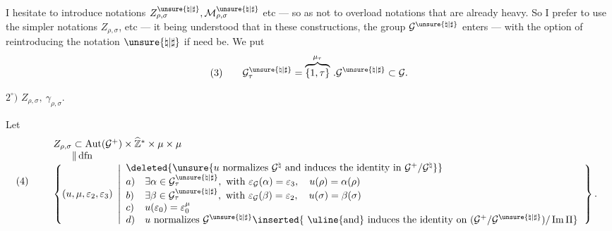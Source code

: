I hesitate to introduce notations
$Z_{\rho,\sigma}^{\unsure{\natural|\sharp}},\mathcal{M}_{\rho,\sigma}^{\unsure{\natural|\sharp}}$
etc --- so as not to overload notations that are already heavy. So I prefer to
use the simpler notations $Z_{\rho,\sigma}$, etc --- it being understood
that in these constructions, the group $\mathcal{G}^{\unsure{\natural|\sharp}}$
enters --- with the option of reintroducing the notation $\unsure{\natural|\sharp}$
if need be.
We put
\[
(3)\qquad
\mathcal{G}_{\tau}^{\unsure{\natural|\sharp}}
=\overbrace{\{1,\tau\}}^{\mu_{\tau}}\,.
\mathcal{G}^{\unsure{\natural|\sharp}}\subset\mathcal{G}.
\]



$2^\circ)$ \quad $Z_{\rho,\sigma},\ \gamma_{\rho,\sigma}$.

Let
\[
(4)\qquad
\begin{array}{l}
 Z_{\rho,\sigma}\subset
 \operatorname{Aut}(\mathcal{G}^{+})\times
 \widehat{\mathbb{Z}}^{*}\times\mu\times\mu\\
 \phantom{Z_{\rho,\sigma}}\Vert\,\mathrm{dfn}\\
 \left\{(u,\mu,\varepsilon_2,\varepsilon_3)\ \left|
 \begin{array}{ll}
 \multicolumn{2}{l}{\deleted{\unsure{u\ \text{normalizes}\ \mathcal{G}^{\natural}\ 
 \text{and induces the identity in}\ \mathcal{G}^{+}/\mathcal{G}^{\natural}}}}\\
 a)&\exists\alpha\in\mathcal{G}_{\tau}^{\unsure{\natural|\sharp}},
 \ \text{with }\varepsilon_{\mathcal{G}}(\alpha)=\varepsilon_3,
 \quad u(\rho)=\alpha(\rho)\\
 b)&\exists\beta\in\mathcal{G}_{\tau}^{\unsure{\natural|\sharp}},
 \ \text{with }\varepsilon_{\mathcal{G}}(\beta)=\varepsilon_2,
 \quad u(\sigma)=\beta(\sigma)\\
 c)&u(\varepsilon_0)=\varepsilon_0^\mu\\
 d)&u\ \text{normalizes }\mathcal{G}^{\unsure{\natural|\sharp}}
 \inserted{\ \text{\uline{and} induces the identity on }
 (\mathcal{G}^{+}/\mathcal{G}^{\unsure{\natural|\sharp}})/\operatorname{Im}\Pi}
 \end{array}\right.\right\}.
\end{array}
\]

